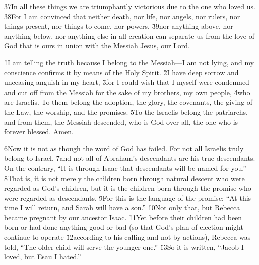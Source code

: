 \v{37}In all these things we are triumphantly victorious due to the one who loved us. \v{38}For I am convinced that neither death, nor life, nor angels, nor rulers, nor things present, nor things to come, nor powers, \v{39}nor anything above, nor anything below, nor anything else in all creation can separate us from the love of God that is ours in union with the Messiah Jesus, our Lord.

\v{1}I am telling the truth because I belong to the Messiah---I am not lying, and my conscience confirms it by means of the Holy Spirit. \v{2}I have deep sorrow and unceasing anguish in my heart, \v{3}for I could wish that I myself were condemned and cut off from the Messiah for the sake of my brothers, my own people, \v{4}who are Israelis. To them belong the adoption, the glory, the covenants, the giving of the Law, the worship, and the promises. \v{5}To the Israelis belong the patriarchs, and from them, the Messiah descended, who is God over all, the one who is forever blessed. Amen.

\v{6}Now it is not as though the word of God has failed. For not all Israelis truly belong to Israel, \v{7}and not all of Abraham's descendants are his true descendants. On the contrary, ``It is through Isaac that descendants will be named for you.'' \v{8}That is, it is not merely the children born through natural descent who were regarded as God's children, but it is the children born through the promise who were regarded as descendants. \v{9}For this is the language of the promise: ``At this time I will return, and Sarah will have a son.'' \v{10}Not only that, but Rebecca became pregnant by our ancestor Isaac. \v{11}Yet before their children had been born or had done anything good or bad (so that God's plan of election might continue to operate \v{12}according to his calling and not by actions), Rebecca was told, ``The older child will serve the younger one.'' \v{13}So it is written, ``Jacob I loved, but Esau I hated.''

